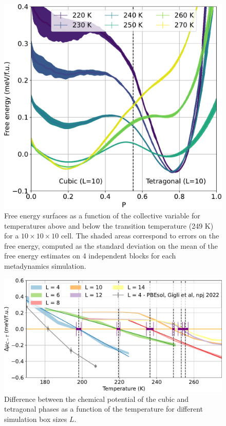 \begin{figure}
    \centering
    \includegraphics[width=0.7\linewidth]{fig/Free-energy_vs_P_101010.pdf}
    \caption{Free energy surfaces as a function of the collective variable for temperatures above and below the transition temperature (249 K) for a $10\times10\times10$ cell. The shaded areas correspond to errors on the free energy, computed as the standard deviation on the mean of the free energy estimates on 4 independent blocks for each metadynamics simulation.}
    \label{fig:1D-free-energy}
\end{figure}

\begin{figure}
    \centering
    \includegraphics[width=0.8\linewidth]{fig/Size-scaling-deltamu.pdf}
    \caption{Difference between the chemical potential of the cubic and tetragonal phases as a function of the temperature for different simulation box sizes $L$.}
    \label{fig:size-scaling-delta-mu}
\end{figure}


